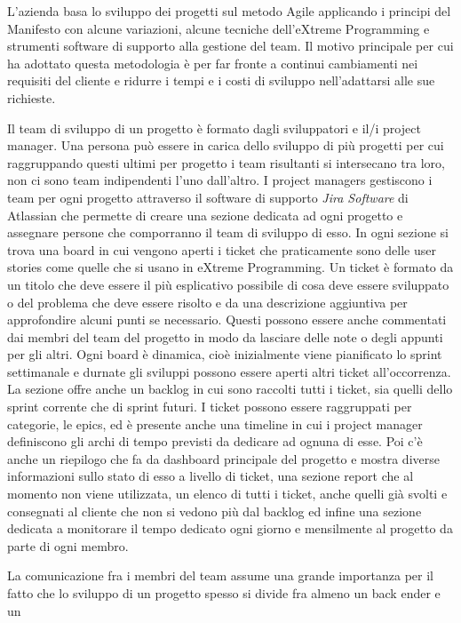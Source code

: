 \documentclass[target=bach,aauheader=,style=]{thud}
\begin{document}
L'azienda basa lo sviluppo dei progetti sul metodo Agile applicando i principi del Manifesto con alcune variazioni, alcune tecniche dell'eXtreme Programming
e strumenti software di supporto alla gestione del team.
Il motivo principale per cui ha adottato questa metodologia è per far fronte a continui cambiamenti nei requisiti del cliente e ridurre i tempi e i costi
di sviluppo nell'adattarsi alle sue richieste.
\par Il team di sviluppo di un progetto è formato dagli sviluppatori e il/i project manager. Una persona può essere in carica dello sviluppo di più progetti per cui
raggruppando questi ultimi per progetto i team risultanti si intersecano tra loro, non ci sono team indipendenti l'uno dall'altro.
I project managers gestiscono i team per ogni progetto attraverso il software di supporto \textit{Jira Software} di Atlassian\cite{atlassian_jira} che permette
di creare una sezione dedicata ad ogni progetto e assegnare persone che comporranno il team di sviluppo di esso.
In ogni sezione si trova una board in cui vengono aperti i ticket che praticamente sono delle user stories come quelle che si usano in eXtreme Programming.
Un ticket è formato da un titolo che deve essere il più esplicativo possibile di cosa deve essere sviluppato o del problema che deve essere risolto e da una
descrizione aggiuntiva per approfondire alcuni punti se necessario. Questi possono essere anche commentati dai membri del team del progetto in modo da lasciare
delle note o degli appunti per gli altri.
Ogni board è dinamica, cioè inizialmente viene pianificato lo sprint settimanale e durnate gli sviluppi possono essere aperti altri ticket all'occorrenza.
La sezione offre anche un backlog in cui sono raccolti tutti i ticket, sia quelli dello sprint corrente che di sprint futuri.
I ticket possono essere raggruppati per categorie, le epics, ed è presente anche una timeline in cui i project manager definiscono gli archi di tempo previsti
da dedicare ad ognuna di esse. Poi c'è anche un riepilogo che fa da dashboard principale del progetto e mostra diverse informazioni sullo stato di esso a livello
di ticket, una sezione report che al momento non viene utilizzata, un elenco di tutti i ticket, anche quelli già svolti e consegnati al cliente che non si vedono
più dal backlog ed infine una sezione dedicata a monitorare il tempo dedicato ogni giorno e mensilmente al progetto da parte di ogni membro.
\par La comunicazione fra i membri del team assume una grande importanza per il fatto che lo sviluppo di un progetto spesso si divide fra almeno un back ender e un
\end{document}
